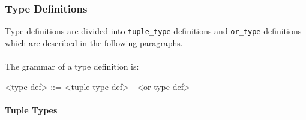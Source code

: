\documentclass{article}
\begin{document}
\newpage

\subsubsection{Type Definitions}
\label{subsubsec:tdefs}

Type definitions are divided into \texttt{tuple_type} definitions and
\texttt{or_type} definitions which are described in the following paragraphs.
\\\\
The grammar of a type definition is:
\begin{grammar}
<type-def> ::= <tuple-type-def> | <or-type-def>
\end{grammar}

\paragraph{Tuple Types}
\end{document}
